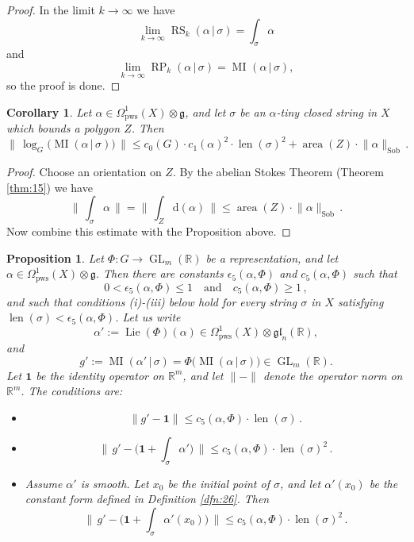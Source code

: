 \documentclass[10pt, a4paper]{amsart}
\newtheorem{cor}[equation]{Corollary}
\newtheorem{prop}[equation]{Proposition}
\theoremstyle{definition}
\numberwithin{equation}{section}
\newcommand{\opn}{\operatorname}
\newcommand{\rmitem}[1]{\item[\text{\textup{(#1)}}]}
\newcommand{\mfrak}[1]{\mathfrak{#1}}
\newcommand{\mrm}[1]{\mathrm{#1}}
\newcommand{\mbb}[1]{\mathbb{#1}}
\newcommand{\tup}[1]{\textup{#1}}
\newcommand{\bsym}[1]{\boldsymbol{#1}}
\newcommand{\norm}[1]{\lVert #1 \rVert}
\newcommand{\Norm}[1]{\bigl\lVert\, #1 \, \bigr\rVert}
\renewcommand{\vert}{\, | \,}
\newcommand{\R}{\mbb{R}}
\newcommand{\g}{\mfrak{g}}
\renewcommand{\d}{\mrm{d}}
\begin{document}
\begin{proof}
In the limit $k \to \infty$ we have
\[ \lim_{k \to \infty} \opn{RS}_{k}(\alpha \vert \sigma) = 
\int_{\sigma} \alpha \]
and 
\[ \lim_{k \to \infty} \opn{RP}_{k}(\alpha \vert \sigma) = 
\opn{MI}_{}(\alpha \vert \sigma) , \]
so the proof is done.
\end{proof}

\begin{cor} \label{cor:7}
Let $\alpha \in \Omega^1_{\mrm{pws}}(X) \otimes \g$, and let $\sigma$ be an
$\alpha$-tiny closed string in $X$ which bounds a polygon $Z$. Then
\[ \Norm{ \log_G \bigl( \opn{MI}(\alpha \vert \sigma) \bigr) } \leq 
c_0(G) \cdot c_1(\alpha)^2 \cdot \opn{len}(\sigma)^2 +
\opn{area}(Z) \cdot \norm{\alpha}_{\mrm{Sob}} \, . \]
\end{cor}

\begin{proof}
Choose an orientation on $Z$.
By the abelian Stokes Theorem (Theorem \ref{thm:15}) we have
\[ \Norm{ \int_{\sigma} \alpha } = \Norm{ \int_Z \d(\alpha) }
\leq \opn{area}(Z) \cdot \norm{\alpha}_{\mrm{Sob}} \, . \]
Now combine this estimate with the Proposition above.
\end{proof}

\begin{prop} \label{prop:21}
Let $\Phi : G \to \opn{GL}_m(\R)$ be a representation,
and let $\alpha \in \Omega^1_{\mrm{pws}}(X) \otimes \g$.
Then there are constants $\epsilon_5(\alpha, \Phi)$ and
$c_5(\alpha, \Phi)$ such that 
\[ 0 < \epsilon_5(\alpha, \Phi) \leq 1 \quad \text{and} \quad
c_5(\alpha, \Phi) \geq 1 \, , \]
and such that conditions \tup{(i)-(iii)} below  hold for every 
string $\sigma$ in $X$ satisfying 
$\opn{len}(\sigma) < \epsilon_5(\alpha, \Phi)$.
Let us write
\[ \alpha' := \opn{Lie}(\Phi)(\alpha) \in 
\Omega^1_{\mrm{pws}}(X) \otimes \mfrak{gl}_n(\R) , \]
and
\[ g' := \opn{MI}(\alpha' \vert \sigma) = \Phi 
\bigl( \opn{MI}(\alpha \vert \sigma) \bigr) \in \opn{GL}_m(\R) . \]
Let $\bsym{1}$ be the identity operator on $\R^m$, and let $\norm{-}$ denote
the operator norm on $\R^m$. 
The conditions are:
\begin{itemize}
\rmitem{i} 
\[ \norm{ g' - \bsym{1} } \leq  c_5(\alpha, \Phi) \cdot \opn{len}(\sigma) \, .
\]
\rmitem{ii}
\[ \Norm{ g' - \bigl( \bsym{1} + \int_{\sigma} \alpha' \bigr) } 
\leq c_5(\alpha, \Phi) \cdot \opn{len}(\sigma)^2 \, . \]
\rmitem{iii} 
Assume $\alpha'$ is smooth. Let $x_0$ be the initial point of $\sigma$, and let
$\alpha'(x_0)$ be the constant form defined in Definition 
\tup{\ref{dfn:26}}. Then
\[ \Norm{ g' - \bigl( \bsym{1} + \int_{\sigma} \alpha'(x_0) \bigr) } 
\leq c_5(\alpha, \Phi) \cdot \opn{len}(\sigma)^2 \, . \]
\end{itemize}
\end{prop}
\end{document}
